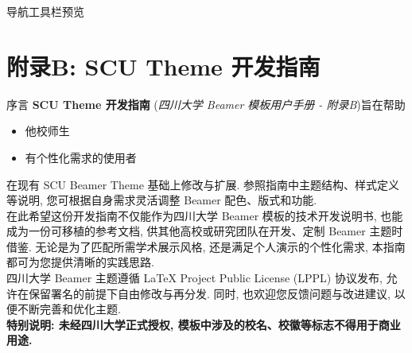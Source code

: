 \begin{frame}{导航工具栏预览 }
\begin{center}
\end{center}
\end{frame}

\section{附录B: SCU Theme 开发指南}
\begin{frame}{序言}
	\textbf{SCU Theme 开发指南} (\textit{四川大学 Beamer 模板用户手册 - 附录B})旨在帮助
  \begin{itemize}
    \item \alert{他校师生}
    \item \alert{有个性化需求的使用者}
  \end{itemize}
  在现有 SCU Beamer Theme 基础上修改与扩展. 参照指南中主题结构、样式定义等说明, 您可根据自身需求灵活调整 Beamer 配色、版式和功能.\\

  在此希望这份开发指南不仅能作为四川大学 Beamer 模板的技术开发说明书, 也能成为一份可移植的参考文档, 供其他高校或研究团队在开发、定制 Beamer 主题时借鉴. 无论是为了匹配所需学术展示风格, 还是满足个人演示的个性化需求, 本指南都可为您提供清晰的实践思路.\\

  四川大学 Beamer 主题遵循 \alert{LaTeX Project Public License (LPPL)} 协议发布, 允许在保留署名的前提下自由修改与再分发. 同时, 也欢迎您反馈问题与改进建议, 以便不断完善和优化主题.\\

  \textbf{\alert{特别说明: 未经四川大学正式授权, 模板中涉及的校名、校徽等标志不得用于商业用途.}}
\end{frame}


